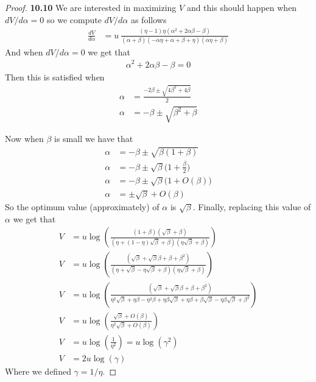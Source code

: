 \documentclass[11pt]{article}
\theoremstyle{definition}
\begin{document}
\begin{proof}{\textbf{10.10}}
        We are interested in maximizing $V$ and this should happen when
        $dV/d\alpha = 0$ so we compute $dV/d\alpha$ as follows
        \begin{align*}
            \frac{dV}{d\alpha} &= u~\frac{
            (\eta - 1)\eta(\alpha^2 + 2\alpha\beta -\beta)
            }{(\alpha + \beta)(-\alpha\eta + \alpha + \beta + \eta)(\alpha\eta + \beta)}
        \end{align*}
        And when $dV/d\alpha = 0$ we get that
        \begin{align*}
            \alpha^2 + 2\alpha\beta -\beta = 0
        \end{align*}
        Then this is satisfied when
        \begin{align*}
            \alpha &= \frac{-2\beta \pm\sqrt{4\beta^2 + 4\beta}}{2}\\
            \alpha &= -\beta \pm \sqrt{\beta^2 + \beta}
        \end{align*}

        Now when $\beta$ is small we have that
        \begin{align*}
            \alpha &= -\beta \pm \sqrt{\beta(1 + \beta)}\\
            \alpha &= -\beta \pm \sqrt{\beta}\bigg(1 + \frac{\beta}{2}\bigg)\\
            \alpha &= -\beta \pm \sqrt{\beta}\bigg(1 + O(\beta)\bigg)\\
            \alpha &= \pm \sqrt{\beta} + O(\beta)
        \end{align*}
        So the optimum value (approximately) of $\alpha$ is $\sqrt{\beta}$.
        Finally, replacing this value of $\alpha$ we get that
        \begin{align*}
            V &= u \log(
                \frac{(1 + \beta)(\sqrt{\beta} + \beta)}
                {(\eta + (1 - \eta)\sqrt{\beta} + \beta)(\eta\sqrt{\beta} + \beta)}
            )\\
            V &= u \log(
                \frac{(\sqrt{\beta} + \sqrt{\beta}\beta + \beta + \beta^2)}
                {(\eta + \sqrt{\beta} - \eta\sqrt{\beta} + \beta)(\eta\sqrt{\beta} + \beta)}
            )\\
            V &= u \log(
                \frac{(\sqrt{\beta} + \sqrt{\beta}\beta + \beta + \beta^2)}
                {\eta^2\sqrt{\beta} + \eta\beta - \eta^2\beta + \eta\beta\sqrt{\beta}
                + \eta\beta + \beta\sqrt{\beta} - \eta\beta\sqrt{\beta} + \beta^2
                }
            )\\
            V &= u \log(
                \frac{\sqrt{\beta} + O(\beta)}{\eta^2\sqrt{\beta} + O(\beta)}
            )\\
            V &= u \log(\frac{1}{\eta^2}) = u \log(\gamma^2)\\
            V &= 2 u \log(\gamma)            
        \end{align*}
        Where we defined $\gamma = 1/\eta$.
    \end{proof}
\end{document}
